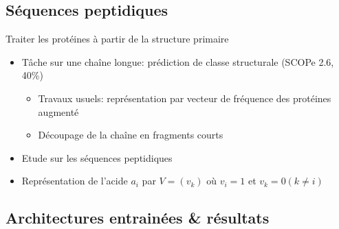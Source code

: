 \documentclass{beamer}
\begin{document}
\subsection{Séquences peptidiques}

\begin{frame}{Traiter les protéines à partir de la structure primaire}

    \begin{itemize}
    \item Tâche sur une chaîne longue: prédiction de classe structurale (SCOPe
      2.6, 40\%)
      \begin{itemize}
      \item Travaux usuels: représentation par vecteur de fréquence des
        protéines augmenté
      \item Découpage de la chaîne en fragments courts
      \end{itemize}
    \item Etude sur les séquences peptidiques
    \item Représentation de l'acide $a_i$ par $V = (v_k)$ où $v_i = 1$ et $v_k =
      0 (k\ne i)$
    \end{itemize}
\end{frame}

\subsection{Architectures entrainées \& résultats}
\end{document}
